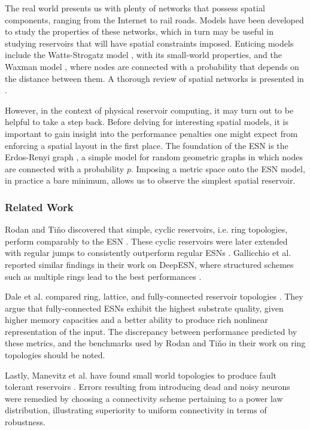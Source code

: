 The real world presents us with plenty of networks that possess spatial
components, ranging from the Internet to rail roads. Models have been developed
to study the properties of these networks, which in turn may be useful in
studying reservoirs that will have spatial constraints imposed. Enticing models
include the Watts-Strogatz model \cite{watts_collective_1998}, with its
small-world properties, and the Waxman model \cite{waxman_routing_1988}, where
nodes are connected with a probability that depends on the distance between
them. A thorough review of spatial networks is presented in
\cite{barthelemy_spatial_2011}.

However, in the context of physical reservoir computing, it may turn out to be
helpful to take a step back. Before delving for interesting spatial models, it
is important to gain insight into the performance penalties one might expect
from enforcing a spatial layout in the first place. The foundation of the ESN is
the Erdos-Renyi graph \cite{erdos_random_1959}, a simple model for random
geometric graphs in which nodes are connected with a probability $p$. Imposing a
metric space onto the ESN model, in practice a bare minimum, allows us to
observe the simplest spatial reservoir.

\subsubsection{Related Work}

Rodan and Tiňo discovered that simple, cyclic reservoirs, i.e. ring topologies,
perform comparably to the ESN \cite{rodan_minimum_2011}. These cyclic reservoirs
were later extended with regular jumps to consistently outperform regular ESNs
\cite{rodan_simple_2012}. Gallicchio et al. reported similar findings in their
work on DeepESN, where structured schemes such as multiple rings lead to the
best performances \cite{gallicchio_reservoir_2019}.

Dale et al. compared ring, lattice, and fully-connected reservoir topologies
\cite{mcquillan_role_2019}.  They argue that fully-connected ESNs exhibit the
highest substrate quality, given higher memory capacities and a better ability
to produce rich nonlinear representation of the input. The discrepancy between
performance predicted by these metrics, and the benchmarks used by Rodan and
Tiňo in their work on ring topologies should be noted.

Lastly, Manevitz et al. have found small world topologies to produce fault
tolerant reservoirs \cite{sidorov_stability_2010}. Errors resulting from
introducing dead and noisy neurons were remedied by choosing a connectivity
scheme pertaining to a power law distribution, illustrating superiority to
uniform connectivity in terms of robustness.

